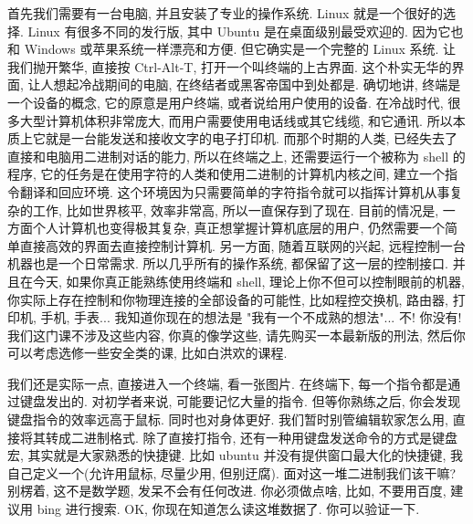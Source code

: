 \documentclass[a4paper]{ctexart}
\begin{document}
首先我们需要有一台电脑, 并且安装了专业的操作系统. Linux 就是一个很好的选择. Linux 有很多不同的发行版,
其中 Ubuntu 是在桌面级别最受欢迎的. 因为它也和 Windows 或苹果系统一样漂亮和方便.
但它确实是一个完整的 Linux 系统. 让我们抛开繁华, 直接按 Ctrl-Alt-T, 打开一个叫终端的上古界面.
这个朴实无华的界面, 让人想起冷战期间的电脑, 在终结者或黑客帝国中到处都是. 确切地讲, 终端是一个设备的概念,
它的原意是用户终端, 或者说给用户使用的设备. 在冷战时代, 很多大型计算机体积非常庞大,
而用户需要使用电话线或其它线缆, 和它通讯. 所以本质上它就是一台能发送和接收文字的电子打印机. 而那个时期的人类,
已经失去了直接和电脑用二进制对话的能力, 所以在终端之上, 还需要运行一个被称为 shell 的程序,
它的任务是在使用字符的人类和使用二进制的计算机内核之间, 建立一个指令翻译和回应环境.
这个环境因为只需要简单的字符指令就可以指挥计算机从事复杂的工作, 比如世界核平, 效率非常高, 所以一直保存到了现在.
目前的情况是, 一方面个人计算机也变得极其复杂, 真正想掌握计算机底层的用户,
仍然需要一个简单直接高效的界面去直接控制计算机. 另一方面, 随着互联网的兴起, 远程控制一台机器也是一个日常需求.
所以几乎所有的操作系统, 都保留了这一层的控制接口. 并且在今天, 如果你真正能熟练使用终端和 shell,
理论上你不但可以控制眼前的机器, 你实际上存在控制和你物理连接的全部设备的可能性, 比如程控交换机, 路由器,
打印机, 手机, 手表... 我知道你现在的想法是 "我有一个不成熟的想法"... 不! 你没有! 我们这门课不涉及这些内容,
你真的像学这些, 请先购买一本最新版的刑法, 然后你可以考虑选修一些安全类的课, 比如白洪欢的课程.

我们还是实际一点, 直接进入一个终端, 看一张图片. 在终端下, 每一个指令都是通过键盘发出的. 对初学者来说,
可能要记忆大量的指令. 但等你熟练之后, 你会发现键盘指令的效率远高于鼠标. 同时也对身体更好.
我们暂时别管编辑软家怎么用, 直接将其转成二进制格式. 除了直接打指令, 还有一种用键盘发送命令的方式是键盘宏,
其实就是大家熟悉的快捷键. 比如 ubuntu 并没有提供窗口最大化的快捷键, 我自己定义一个(允许用鼠标, 尽量少用,
但别迂腐). 面对这一堆二进制我们该干嘛? 别楞着, 这不是数学题, 发呆不会有任何改进. 你必须做点啥, 比如,
不要用百度, 建议用 bing 进行搜索. OK, 你现在知道怎么读这堆数据了. 你可以验证一下. 





\end{document}
